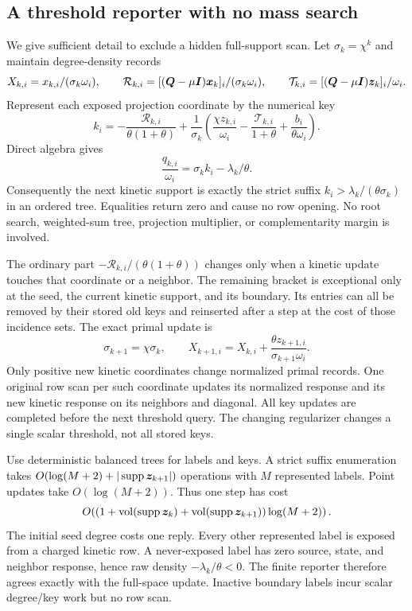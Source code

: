 \subsection{A threshold reporter with no mass search}
We give sufficient detail to exclude a hidden full-support scan.
Let $\sigma_k=\chi^k$ and maintain degree-density records
\begin{equation}
 X_{k,i}=x_{k,i}/(\sigma_k\omega_i),\qquad
 \mathcal R_{k,i}=[(\bm{Q}-\mu\bm{I})\bm{x}_k]_i/(\sigma_k\omega_i),\qquad
 \mathcal T_{k,i}=[(\bm{Q}-\mu\bm{I})\bm{z}_k]_i/\omega_i.
 \label{eq:revisit-lazy-records}
\end{equation}
Represent each exposed projection coordinate by the numerical key
\begin{equation}
 k_i=-\frac{\mathcal R_{k,i}}{\theta(1+\theta)}
 +\frac1{\sigma_k}\left(
       \frac{\chi z_{k,i}}{\omega_i}
       -\frac{\mathcal T_{k,i}}{1+\theta}
       +\frac{b_i}{\theta\omega_i}\right).
 \label{eq:revisit-key}
\end{equation}
Direct algebra gives
\begin{equation}
 \frac{q_{k,i}}{\omega_i}=\sigma_k k_i-\lambda_k/\theta.
 \label{eq:revisit-key-threshold}
\end{equation}
Consequently the next kinetic support is exactly the strict suffix
$k_i>\lambda_k/(\theta\sigma_k)$ in an ordered tree. Equalities return
zero and cause no row opening. No root search, weighted-sum tree, projection
multiplier, or complementarity margin is involved.

The ordinary part $-\mathcal R_{k,i}/(\theta(1+\theta))$ changes only
when a kinetic update touches that coordinate or a neighbor. The remaining
bracket is exceptional only at the seed, the current kinetic support, and
its boundary. Its entries can all be removed by their stored old keys and
reinserted after a step at the cost of those incidence sets. The exact
primal update is
\[
 \sigma_{k+1}=\chi\sigma_k,\qquad
 X_{k+1,i}=X_{k,i}+
                   \frac{\theta z_{k+1,i}}{\sigma_{k+1}\omega_i}.
\]
Only positive new kinetic coordinates change normalized primal records.
One original row scan per such coordinate updates its normalized response
and its new kinetic response on its neighbors and diagonal. All key updates
are completed before the next threshold query. The changing regularizer
changes a single scalar threshold, not all stored keys.

Use deterministic balanced trees for labels and keys. A strict suffix
enumeration takes $O(\log(M+2)+|\operatorname{supp}\bm{z}_{k+1}|)$ operations with $M$
represented labels. Point updates take $O(\log(M+2))$. Thus one step has
cost
\[
 O\!\left((1+\operatorname{vol}(\operatorname{supp}\bm{z}_k)+\operatorname{vol}(\operatorname{supp}\bm{z}_{k+1}))\log(M+2)\right).
\]
The initial seed degree costs one reply. Every other represented label is
exposed from a charged kinetic row. A never-exposed label has zero source,
state, and neighbor response, hence raw density $-\lambda_k/\theta<0$.
The finite reporter therefore agrees exactly with the full-space update.
Inactive boundary labels incur scalar degree/key work but no row scan.

